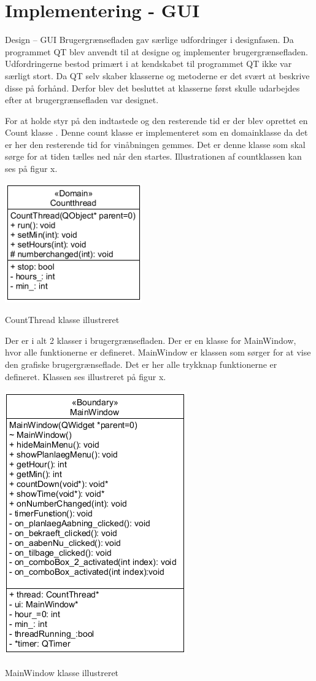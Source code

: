 \section*{Implementering - GUI}

Design – GUI
Brugergrænsefladen gav særlige udfordringer i designfasen. Da programmet QT blev anvendt til at designe og implementer brugergrænsefladen. Udfordringerne bestod primært i at kendskabet til programmet QT ikke var særligt stort. Da QT selv skaber klasserne og metoderne er det svært at beskrive disse på forhånd. Derfor blev det besluttet at klasserne først skulle udarbejdes efter at brugergrænsefladen var designet. 

For at holde styr på den indtastede og den resterende tid er der blev oprettet en Count klasse . Denne count klasse er implementeret som en domainklasse da det er her den resterende tid for vinåbningen gemmes. Det er denne klasse som skal sørge for at tiden tælles ned når den startes. Illustrationen af countklassen kan ses på figur x.


\includegraphics{Billeder/CountThread}
\caption{CountThread klasse illustreret}

Der er i alt 2 klasser i brugergrænsefladen. Der er en klasse for MainWindow, hvor alle funktionerne er defineret. MainWindow er klassen som sørger for at vise den grafiske brugergrænseflade. Det er her alle trykknap funktionerne er defineret. Klassen ses illustreret på figur x. 

\includegraphics{Billeder/MainWindow}
\caption{MainWindow klasse illustreret}

